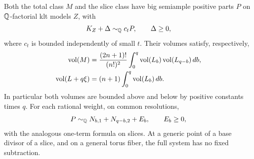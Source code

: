 \begin{lemma}\label{proj:jet:bundle-models}
Both the total class \(M\) and the slice class have big semiample
positive parts \(P\) on \(\mathbb{Q}\)-factorial klt models \(Z\), with
\[
 K_Z+\Delta\sim_{\mathbb{Q}}c_tP,\qquad \Delta\ge0,
\]
where \(c_t\) is bounded independently of small \(t\).
Their volumes satisfy, respectively,
\begin{align}
 \operatorname{vol}(M)&=\frac{(2n+1)!}{(n!)^2}
   \int_0^q\operatorname{vol}(L_b)\operatorname{vol}(L_{q-b})\,db,\label{proj:jet:total-volume}\\
 \operatorname{vol}(L+q\xi)&=(n+1)\int_0^q\operatorname{vol}(L_b)\,db.\label{proj:jet:slice-volume}
\end{align}
In particular both volumes are bounded above and below by positive
constants times \(q\).  For each rational weight, on common
resolutions,
\begin{equation}\label{proj:jet:weight-domination}
 P\sim_{\mathbb{Q}}N_{b,1}+N_{q-b,2}+E_b,\qquad E_b\ge0,
\end{equation}
with the analogous one-term formula on slices.
At a generic point of a base divisor of a slice, and on a general
torus fiber, the full system has no fixed subtraction.
\end{lemma}

